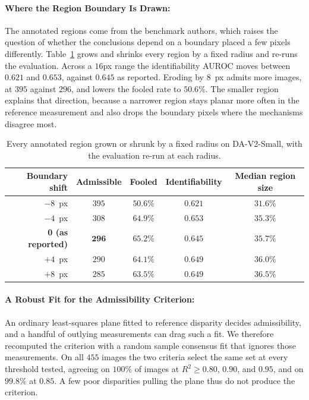 \documentclass{article} %
\theoremstyle{defstyle}
\theoremstyle{plain}
\begin{document}
\paragraph{Where the Region Boundary Is Drawn:}
The annotated regions come from the benchmark authors, which raises the question of whether the
conclusions depend on a boundary placed a few pixels differently. Table~\ref{tab:supp-mask}
grows and shrinks every region by a fixed radius and re-runs the evaluation. Across a $16$px
range the identifiability AUROC moves between $0.621$ and $0.653$, against $0.645$ as reported.
Eroding by $8$~px admits more images, at $395$ against $296$, and lowers the fooled rate to
$50.6\%$. The smaller region explains that direction, because a narrower region stays planar
more often in the reference measurement and also drops the boundary pixels where the mechanisms
disagree most.

\begin{table}[htb]
\caption{Every annotated region grown or shrunk by a fixed radius on DA-V2-Small, with the evaluation re-run at each radius.}
\label{tab:supp-mask}
\begin{center}
\footnotesize
\begin{tabular}{rcccc}
\toprule
\textbf{Boundary shift} & \textbf{Admissible} & \textbf{Fooled} &
\textbf{Identifiability} & \textbf{Median region size} \\
\midrule
$-8$~px & $395$ & $50.6\%$ & $0.621$ & $31.6\%$ \\
$-4$~px & $308$ & $64.9\%$ & $0.653$ & $35.3\%$ \\
\textbf{0 (as reported)} & $\mathbf{296}$ & $\mathbf{65.2\%}$ & $\mathbf{0.645}$ & $35.7\%$ \\
$+4$~px & $290$ & $64.1\%$ & $0.649$ & $36.0\%$ \\
$+8$~px & $285$ & $63.5\%$ & $0.649$ & $36.5\%$ \\
\bottomrule
\end{tabular}
\end{center}
\end{table}

\paragraph{A Robust Fit for the Admissibility Criterion:}
An ordinary least-squares plane fitted to reference disparity decides admissibility, and a
handful of outlying measurements can drag such a fit. We therefore recomputed the criterion
with a random sample consensus fit that ignores those measurements. On all $455$ images the two
criteria select the same set at every threshold tested, agreeing on $100\%$ of images at $R^2
\geq 0.80$, $0.90$, and $0.95$, and on $99.8\%$ at $0.85$. A few poor disparities pulling the
plane thus do not produce the criterion.
\end{document}
